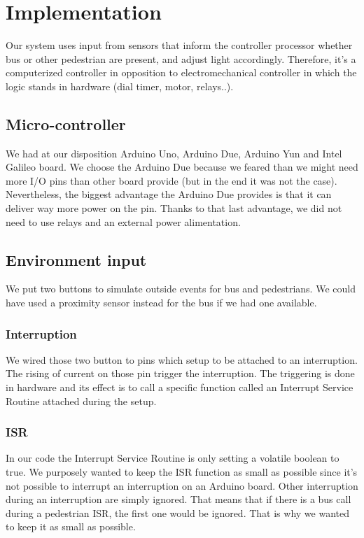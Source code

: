 \section{Implementation}

Our system uses input from sensors that inform the controller processor whether bus or other pedestrian are present, and adjust light accordingly. Therefore, it's a computerized controller in opposition to electromechanical controller in which the logic stands in hardware (dial timer, motor, relays..).

\subsection{Micro-controller}

We had at our disposition Arduino Uno, Arduino Due, Arduino Yun and Intel Galileo board. We choose the Arduino Due because we feared than we might need more I/O pins than other board provide (but in the end it was not the case).	 Nevertheless, the biggest advantage the Arduino Due provides is that it can deliver way more power on the pin. Thanks to that last advantage, we did not need to use relays and an external power alimentation.

\subsection{Environment input}

We put two buttons to simulate outside events for bus and pedestrians. We could have used a proximity sensor instead for the bus if we had one available.

\subsubsection{Interruption}

We wired those two button to pins which setup to be attached to an interruption. The rising of current on those pin trigger the interruption. The triggering is done in hardware and its effect is to call a specific function called an Interrupt Service Routine attached during the setup.

\subsubsection{ISR}

In our code the Interrupt Service Routine is only setting a volatile boolean to true. We purposely wanted to keep the ISR function as small as possible since it's not possible to interrupt an interruption on an Arduino board. Other interruption during an interruption are simply ignored. That means that if there is a bus call during a pedestrian ISR, the first one would be ignored. That is why we wanted to keep it as small as possible. 


